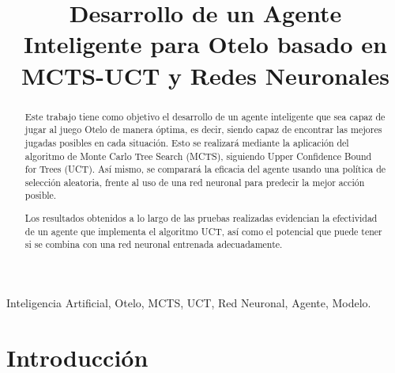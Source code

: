 \documentclass[conference,a4paper]{IEEEtran}
\begin{document}
\title{Desarrollo de un Agente Inteligente para Otelo basado en MCTS-UCT y Redes Neuronales}

\author{
  
  \and
  
}

\maketitle


\begin{abstract}
  Este trabajo tiene como objetivo el desarrollo de un agente inteligente que sea capaz de jugar al juego Otelo 
  de manera óptima, es decir, siendo capaz de encontrar las mejores jugadas posibles en cada situación. Esto 
  se realizará mediante la aplicación del algoritmo de Monte Carlo Tree Search (MCTS), siguiendo Upper Confidence 
  Bound for Trees (UCT). Así mismo, se comparará la eficacia del agente usando una política de selección aleatoria, 
  frente al uso de una red neuronal para predecir la mejor acción posible.
  
  Los resultados obtenidos a lo largo de las pruebas realizadas evidencian la efectividad de un agente que implementa el algoritmo UCT, 
  así como el potencial que puede tener si se combina con una red neuronal entrenada adecuadamente.

\end{abstract}


\begin{IEEEkeywords}
  Inteligencia Artificial, Otelo, MCTS, UCT, Red Neuronal, Agente, Modelo.
\end{IEEEkeywords}


\section{Introducción}
\end{document}
